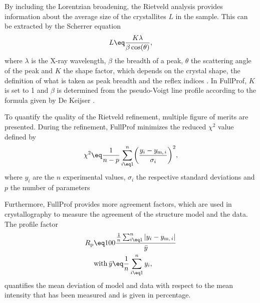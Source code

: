 \documentclass[\main/dresen_thesis.tex]{subfiles}
\begin{document}
    By including the Lorentzian broadening, the Rietveld analysis provides information about the average size of the crystallites $L$ in the sample.
    This can be extracted by the Scherrer equation
    \begin{equation}
      L \eq \frac{K \lambda}{\beta \cos(\theta)},
    \end{equation}
    where $\lambda$ is the X-ray wavelength, $\beta$ the breadth of a peak, $\theta$ the scattering angle of the peak and $K$ the shape factor, which depends on the crystal shape, the definition of what is taken as peak breadth and the reflex indices \cite{Langford_1978_Scher}.
    In FullProf, $K$ is set to 1 and $\beta$ is determined from the pseudo-Voigt line profile according to the formula given by De Keijser \cite{DeKeijser_1982_Useof}.

    To quantify the quality of the Rietveld refinement, multiple figure of merits are presented.
    During the refinement, FullProf minimizes the reduced $\chi^2$ value defined by
    \begin{align}
      \chi^2 \eq \frac{1}{n-p} \sum_{i \eq 1}^n \biggl(\frac{y_i - y_{\mathrm{m},\,i}}{\sigma_i}\biggr)^2,
    \end{align}
    where $y_i$ are the $n$ experimental values, $\sigma_i$ the respective standard deviations and $p$ the number of parameters

    Furthermore, FullProf provides more agreement factors, which are used in crystallography to measure the agreement of the structure model and the data.
    The profile factor
    \begin{align}
      \begin{split}
        R_\mathrm{p}
        &\eq 100\frac{\frac{1}{n}\sum_{i\eq1}^n |y_i - y_{\mathrm{m},\,i}|}{\bar{y}}\\
        &\mathrm{with\,} \bar{y} \eq \frac{1}{n}\sum_{i\eq1}^n y_i,
      \end{split}
    \end{align}
    quantifies the mean deviation of model and data with respect to the mean intensity that has been measured and is given in percentage.
\end{document}
